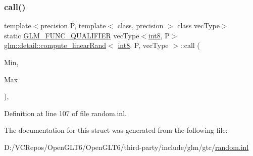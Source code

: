 \subsubsection{\texorpdfstring{call()}{call()}}
{\footnotesize\ttfamily template$<$precision P, template$<$ class, precision $>$ class vec\+Type$>$ \\
static \mbox{\hyperlink{setup_8hpp_a33fdea6f91c5f834105f7415e2a64407}{G\+L\+M\+\_\+\+F\+U\+N\+C\+\_\+\+Q\+U\+A\+L\+I\+F\+I\+ER}} vec\+Type$<$\mbox{\hyperlink{namespaceglm_1_1detail_a04b526a8d7a9b455602a0afa78c531e0}{int8}}, P$>$ \mbox{\hyperlink{structglm_1_1detail_1_1compute__linear_rand}{glm\+::detail\+::compute\+\_\+linear\+Rand}}$<$ \mbox{\hyperlink{namespaceglm_1_1detail_a04b526a8d7a9b455602a0afa78c531e0}{int8}}, P, vec\+Type $>$\+::call (\begin{DoxyParamCaption}\item[{vec\+Type$<$ \mbox{\hyperlink{namespaceglm_1_1detail_a04b526a8d7a9b455602a0afa78c531e0}{int8}}, P $>$ const \&}]{Min,  }\item[{vec\+Type$<$ \mbox{\hyperlink{namespaceglm_1_1detail_a04b526a8d7a9b455602a0afa78c531e0}{int8}}, P $>$ const \&}]{Max }\end{DoxyParamCaption})\hspace{0.3cm}{\ttfamily [inline]}, {\ttfamily [static]}}



Definition at line 107 of file random.\+inl.



The documentation for this struct was generated from the following file\+:\begin{DoxyCompactItemize}
\item 
D\+:/\+V\+C\+Repos/\+Open\+G\+L\+T6/\+Open\+G\+L\+T6/third-\/party/include/glm/gtc/\mbox{\hyperlink{random_8inl}{random.\+inl}}\end{DoxyCompactItemize}
